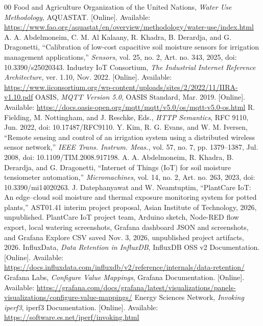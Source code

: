 \begin{thebibliography}{00}
 Food and Agriculture Organization of the United Nations, \emph{Water Use Methodology}, AQUASTAT. [Online]. Available: \url{https://www.fao.org/aquastat/en/overview/methodology/water-use/index.html}
 A. A. Abdelmoneim, C. M. Al Kalaany, R. Khadra, B. Derardja, and G. Dragonetti, “Calibration of low-cost capacitive soil moisture sensors for irrigation management applications,” \emph{Sensors}, vol. 25, no. 2, Art. no. 343, 2025, doi: 10.3390/s25020343.
 Industry IoT Consortium, \emph{The Industrial Internet Reference Architecture}, ver. 1.10, Nov. 2022. [Online]. Available: \url{https://www.iiconsortium.org/wp-content/uploads/sites/2/2022/11/IIRA-v1.10.pdf}
 OASIS, \emph{MQTT Version 5.0}, OASIS Standard, Mar. 2019. [Online]. Available: \url{https://docs.oasis-open.org/mqtt/mqtt/v5.0/os/mqtt-v5.0-os.html}
 R. Fielding, M. Nottingham, and J. Reschke, Eds., \emph{HTTP Semantics}, RFC 9110, Jun. 2022, doi: 10.17487/RFC9110.
 Y. Kim, R. G. Evans, and W. M. Iversen, “Remote sensing and control of an irrigation system using a distributed wireless sensor network,” \emph{IEEE Trans. Instrum. Meas.}, vol. 57, no. 7, pp. 1379--1387, Jul. 2008, doi: 10.1109/TIM.2008.917198.
 A. A. Abdelmoneim, R. Khadra, B. Derardja, and G. Dragonetti, “Internet of Things (IoT) for soil moisture tensiometer automation,” \emph{Micromachines}, vol. 14, no. 2, Art. no. 263, 2023, doi: 10.3390/mi14020263.
 J. Datephanyawat and W. Neamtuptim, “PlantCare IoT: An edge--cloud soil moisture and thermal exposure monitoring system for potted plants,” AST01.41 interim project proposal, Asian Institute of Technology, 2026, unpublished.
 PlantCare IoT project team, Arduino sketch, Node-RED flow export, local watering screenshots, Grafana dashboard JSON and screenshots, and Grafana Explore CSV saved Nov. 3, 2026, unpublished project artifacts, 2026.
 InfluxData, \emph{Data Retention in InfluxDB}, InfluxDB OSS v2 Documentation. [Online]. Available: \url{https://docs.influxdata.com/influxdb/v2/reference/internals/data-retention/}
 Grafana Labs, \emph{Configure Value Mappings}, Grafana Documentation. [Online]. Available: \url{https://grafana.com/docs/grafana/latest/visualizations/panels-visualizations/configure-value-mappings/}
 Energy Sciences Network, \emph{Invoking iperf3}, iperf3 Documentation. [Online]. Available: \url{https://software.es.net/iperf/invoking.html}
\end{thebibliography}

